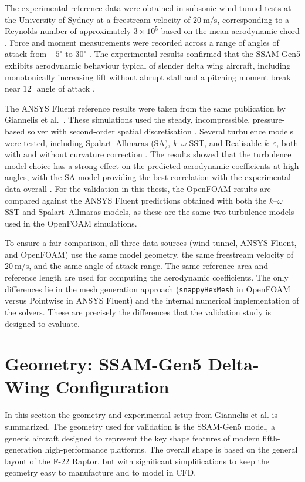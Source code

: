 The experimental reference data were obtained in subsonic wind tunnel tests at the University of Sydney at a freestream velocity of $20~\mathrm{m/s}$, corresponding to a Reynolds number of approximately $3 \times 10^{5}$ based on the mean aerodynamic chord \cite{Giannelis2023SSAMGen5}. Force and moment measurements were recorded across a range of angles of attack from $-5^{\circ}$ to $30^{\circ}$ \cite{Giannelis2023SSAMGen5}. The experimental results confirmed that the SSAM-Gen5 exhibits aerodynamic behaviour typical of slender delta wing aircraft, including monotonically increasing lift without abrupt stall and a pitching moment break near $12^{\circ}$ angle of attack \cite{Giannelis2023SSAMGen5}.

The ANSYS Fluent reference results were taken from the same publication by Giannelis et al.\ \cite{Giannelis2023SSAMGen5}. These simulations used the steady, incompressible, pressure-based solver with second-order spatial discretisation \cite{Giannelis2023SSAMGen5}. Several turbulence models were tested, including Spalart--Allmaras (SA), $k$--$\omega$ SST, and Realisable $k$--$\varepsilon$, both with and without curvature correction \cite{Giannelis2023SSAMGen5}. The results showed that the turbulence model choice has a strong effect on the predicted aerodynamic coefficients at high angles, with the SA model providing the best correlation with the experimental data overall \cite{Giannelis2023SSAMGen5}. For the validation in this thesis, the OpenFOAM results are compared against the ANSYS Fluent predictions obtained with both the $k$--$\omega$ SST and Spalart--Allmaras models, as these are the same two turbulence models used in the OpenFOAM simulations.

To ensure a fair comparison, all three data sources (wind tunnel, ANSYS Fluent, and OpenFOAM) use the same model geometry, the same freestream velocity of $20~\mathrm{m/s}$, and the same angle of attack range. The same reference area and reference length are used for computing the aerodynamic coefficients. The only differences lie in the mesh generation approach (\texttt{snappyHexMesh} in OpenFOAM versus Pointwise in ANSYS Fluent) and the internal numerical implementation of the solvers. These are precisely the differences that the validation study is designed to evaluate.

\section{Geometry: SSAM-Gen5 Delta-Wing Configuration}
In this section the geometry and experimental setup from Giannelis et al. \cite{Giannelis2023SSAMGen5} is summarized.
The geometry used for validation is the SSAM-Gen5 model, a generic aircraft designed to represent the key shape features of modern fifth-generation high-performance platforms. The overall shape is based on the general layout of the F-22 Raptor, but with significant simplifications to keep the geometry easy to manufacture and to model in CFD.

